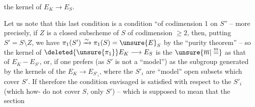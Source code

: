 the kernel of $E_K\longrightarrow E_S$.

Let us note that this last condition is a condition ``of codimension 1 on $S$'' -- more precisely, if $Z$ is a closed subscheme of $S$ of codimension $\geq 2$,  then, putting $S'=S\setminus Z$, we have $\pi_1(S')\xrightarrow{\sim}\pi_1(S)=\unsure{E}_S$ by the ``purity theorem'' -- so the kernel of $\deleted{\unsure{\pi_1}}E_K\longrightarrow E_S$ is the $\unsure{\overline m|\overset{m}{=}}$ as that of $E_K-E_{S'}$, or, if one prefers (as $S'$ is not a ``model'') as the  subgroup generated by the kernels of the $E_K\longrightarrow E_{S'_i}$, where the $S'_i$ are ``model'' open subsets which cover $S'$. If therefore the condition envisaged is satisfied with respect to the $S'_i$ (which how- do not cover $S$, only $S'$) -- which is supposed to mean that the section
